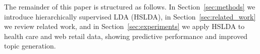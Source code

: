 The remainder of this paper is structured as follows.  In Section~\ref{sec:methods} we introduce hierarchically supervised LDA (HSLDA), in Section~\ref{sec:related_work} we review related work, and in Section~\ref{sec:experiments} we apply HSLDA to health care and web retail data, showing predictive performance and improved topic generation.   




%



